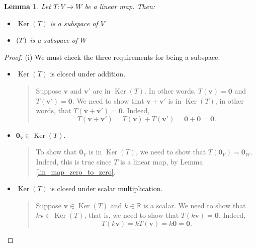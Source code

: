 \documentclass[a4paper,11pt]{book}
\newtheorem{lemma}[theorem]{Lemma}
\theoremstyle{definition}
\newcommand{\ve}[1]{\mathbf{#1}}
\DeclareMathOperator{\Ker}{Ker}
\let\Im\relax
\DeclareMathOperator{\Im}{Im} %
\begin{document}
\begin{lemma} \label{ker-im-subspace} Let $T : V \rightarrow W$ be a linear map. Then: 
\begin{itemize}
 \item[(i)] $\Ker(T)$ is a subspace of $V$
 \item[(ii)] $\Im(T)$ is a subspace of $W$
\end{itemize} 
\end{lemma}
\begin{proof} (i) We must check the three requirements for being a subspace.
\begin{itemize}
\item[a.] $\Ker(T)$ is closed under addition.
\begin{quote} Suppose $\ve{v}$ and $\ve{v}'$ are in $\Ker(T)$. In other words, $T(\ve{v}) = \ve{0}$ and $T(\ve{v}') = \ve{0}$. We need to show that $\ve{v} + \ve{v}'$ is in $\Ker(T)$, in other words, that $T(\ve{v} + \ve{v}') = \ve{0}$. Indeed,
\[
 T(\ve{v} + \ve{v}') = T(\ve{v}) + T(\ve{v}') = \ve{0} + \ve{0} = \ve{0}.
\]
\end{quote}
\item[b.] $\ve{0}_V \in \Ker(T)$.
\begin{quote}
To show that $\ve{0}_V$ is in $\Ker(T)$, we need to show that $T(\ve{0}_V) = \ve{0}_W$. Indeed, this is true since $T$ is a linear map, by Lemma \ref{lin_map_zero_to_zero}. 
\end{quote}
\item[c.] $\Ker(T)$ is closed under scalar multiplication.
\begin{quote} Suppose $\ve{v} \in \Ker(T)$ and $k \in \mathbb{R}$ is a scalar. We need to show that $k \ve{v} \in \Ker(T)$, that is, we need to show that $T(k \ve{v}) = \ve{0}$. Indeed,
\[
T(k \ve{v}) = k T(\ve{v}) = k \ve{0} = \ve{0}.
\]
\end{quote}
\end{itemize}


\end{proof}
\end{document}
